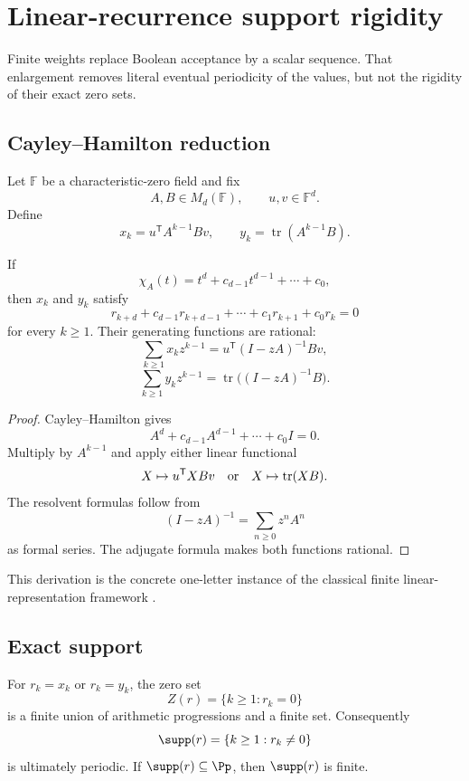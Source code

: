 \section{Linear-recurrence support rigidity}
\label{sec:lrs}

Finite weights replace Boolean acceptance by a scalar sequence.  That
enlargement removes literal eventual periodicity of the values, but not the
rigidity of their exact zero sets.

\subsection{Cayley--Hamilton reduction}

Let \(\mathbb F\) be a characteristic-zero field and fix
\[
        A,B\in M_d(\mathbb F),\qquad u,v\in\mathbb F^d.
\]
Define
\[
 x_k=u^{\mathsf T}A^{k-1}Bv,\qquad
 y_k=\operatorname{tr}(A^{k-1}B).
\]

\begin{theorem}
\label{thm:recurrence}
If
\[
 \chi_A(t)=t^d+c_{d-1}t^{d-1}+\cdots+c_0,
\]
then \(x_k\) and \(y_k\) satisfy
\[
 r_{k+d}+c_{d-1}r_{k+d-1}
 +\cdots+c_1r_{k+1}+c_0r_k=0
\]
for every \(k\ge1\).  Their generating functions are rational:
\[
 \sum_{k\ge1}x_kz^{k-1}
 =u^{\mathsf T}(I-zA)^{-1}Bv,
\]
\[
 \sum_{k\ge1}y_kz^{k-1}
 =\operatorname{tr}\bigl((I-zA)^{-1}B\bigr).
\]
\end{theorem}

\begin{proof}
Cayley--Hamilton gives
\[
        A^d+c_{d-1}A^{d-1}+\cdots+c_0I=0.
\]
Multiply by \(A^{k-1}\) and apply either linear functional
\[
        X\mapsto u^{\mathsf T}XBv
\quad\hbox{or}\quad
        X\mapsto\operatorname{tr}(XB).
\]
The resolvent formulas follow from
\[
        (I-zA)^{-1}=\sum_{n\ge0}z^nA^n
\]
as formal series.  The adjugate formula makes both functions rational.
\end{proof}

This derivation is the concrete one-letter instance of the classical
finite linear-representation framework \citep{Schutzenberger1961}.

\subsection{Exact support}

\begin{theorem}
\label{thm:smlsupport}
For \(r_k=x_k\) or \(r_k=y_k\), the zero set
\[
        Z(r)=\{k\ge1:r_k=0\}
\]
is a finite union of arithmetic progressions and a finite set.  Consequently
\[
        \supp(r)=\{k\ge1:r_k\ne0\}
\]
is ultimately periodic.  If \(\supp(r)\subseteq\Pp\), then
\(\supp(r)\) is finite.
\end{theorem}

